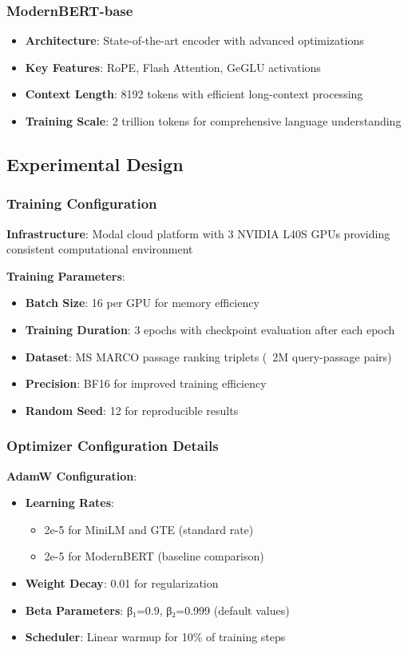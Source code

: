 \subsubsection{ModernBERT-base}
\begin{itemize}
    \item \textbf{Architecture}: State-of-the-art encoder with advanced optimizations
    \item \textbf{Key Features}: RoPE, Flash Attention, GeGLU activations
    \item \textbf{Context Length}: 8192 tokens with efficient long-context processing
    \item \textbf{Training Scale}: 2 trillion tokens for comprehensive language understanding
\end{itemize}

\subsection{Experimental Design}

\subsubsection{Training Configuration}

\textbf{Infrastructure}: Modal cloud platform with 3 NVIDIA L40S GPUs providing consistent computational environment

\textbf{Training Parameters}:
\begin{itemize}
    \item \textbf{Batch Size}: 16 per GPU for memory efficiency
    \item \textbf{Training Duration}: 3 epochs with checkpoint evaluation after each epoch
    \item \textbf{Dataset}: MS MARCO passage ranking triplets (~2M query-passage pairs)
    \item \textbf{Precision}: BF16 for improved training efficiency
    \item \textbf{Random Seed}: 12 for reproducible results
\end{itemize}

\subsubsection{Optimizer Configuration Details}

\textbf{AdamW Configuration}:
\begin{itemize}
    \item \textbf{Learning Rates}: 
    \begin{itemize}
        \item 2e-5 for MiniLM and GTE (standard rate)
        \item 2e-5 for ModernBERT (baseline comparison)
    \end{itemize}
    \item \textbf{Weight Decay}: 0.01 for regularization
    \item \textbf{Beta Parameters}: β₁=0.9, β₂=0.999 (default values)
    \item \textbf{Scheduler}: Linear warmup for 10\% of training steps
\end{itemize}

